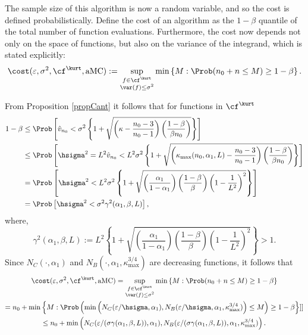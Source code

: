 \documentclass[12pt]{amsart}
\newcommand{\hv}{\hat{v}}
\DeclareMathOperator{\aMC}{aMC}
\begin{document}
The sample size of this algorithm is now a random variable, and so the cost is defined probabilistically.  Define the cost of an algorithm as the $1-\beta$ quantile of the total number of function evaluations.  Furthermore, the cost now depends not only on the space of functions, but also on the variance of the integrand, which is stated explicitly:
\begin{equation}
\cost(\varepsilon,\sigma^2,\cf^{\kurt},\aMC) := \sup_{\substack{f \in \cf^{\kurt}\\ \var(f)\le \sigma^2} } \min\left\{M : \Prob(n_0 + n \le M) \ge 1-\beta  \right \}.
\end{equation}

From Proposition \ref{propCant} it follows that for functions in $\cf^{\kurt}$
\begin{align*}
1-\beta & \le \Prob\left[\hv_{n_0} < \sigma^2 \left\{1 + \sqrt{\left ( \kappa  - \frac{n_0-3}{n_0-1}\right)\left(\frac{1-\beta}{\beta n_0}\right)}\right\} \right] \\
& \le \Prob\left[\hsigma^2 = L^2 \hv_{n_0} < L^2\sigma^2 \left\{1 + \sqrt{\left ( \kappa_{\max}(n_0,\alpha_1,L)  - \frac{n_0-3}{n_0-1}\right)\left(\frac{1-\beta}{\beta n_0}\right)}\right\} \right] \\
& = \Prob\left[\hsigma^2 < L^2\sigma^2 \left\{1 + \sqrt{\left(\frac{ \alpha_1 }{1-\alpha_1}\right) \left(\frac{1-\beta}{\beta}\right) \left(1 - \frac{1}{L^2}\right)^2}\right\} \right] \\
& = \Prob\left[\hsigma^2 < \sigma^2 \gamma^2(\alpha_1,\beta,L) \right],
\end{align*}
where,
\[
\gamma^2(\alpha_1,\beta,L) := L^2 \left\{1 + \sqrt{\left(\frac{ \alpha_1 }{1-\alpha_1}\right) \left(\frac{1-\beta}{\beta}\right) \left(1 - \frac{1}{L^2}\right)^2}\right\} > 1.
\]
Since $N_C(\cdot,\alpha_1)$ and $N_B(\cdot,\alpha_1,\kappa_{\max}^{3/4})$ are decreasing functions, it follows that
\begin{multline} \label{adaptcost}
\cost(\varepsilon,\sigma^2,\cf^{\kurt},\aMC) = \sup_{\substack{f \in \cf^{\kurt}\\ \var(f)\le \sigma^2} } \min\left\{M : \Prob(n_0 + n \le M) \ge 1-\beta  \right \}\\
= n_0 + \min\left\{M : \Prob\left( \min\left( N_C(\varepsilon/\hsigma,\alpha_1), N_B(\varepsilon/\hsigma,\alpha_1,\kappa_{\max}^{3/4}) \right) \le M\right) \ge 1-\beta  \right \}]] \\
\le n_0 + \min\left( N_C(\varepsilon/(\sigma\gamma(\alpha_1,\beta,L)),\alpha_1), N_B(\varepsilon/(\sigma\gamma(\alpha_1,\beta,L)),\alpha_1,\kappa_{\max}^{3/4}) \right).
\end{multline}
\end{document}
